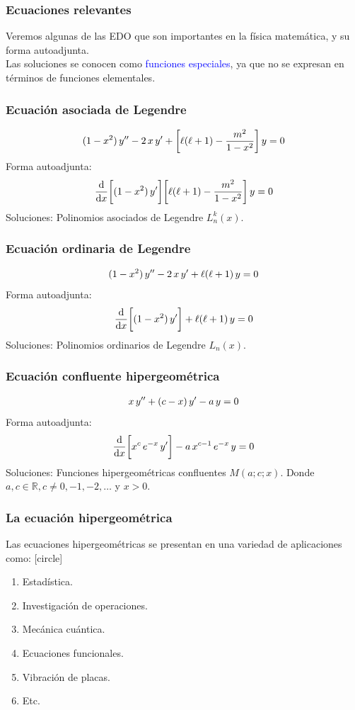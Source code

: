 \documentclass[12pt]{beamer}
\begin{document}
\begin{frame}
\frametitle{Ecuaciones relevantes}
Veremos algunas de las EDO que son importantes en la física matemática, y su forma autoadjunta.
\\
\bigskip
\pause
Las soluciones se conocen como \textcolor{blue}{funciones especiales}, ya que no se expresan en términos de funciones elementales.
\end{frame}
\begin{frame}
\frametitle{Ecuación asociada de Legendre}
\begin{align*}
(1 -x^{2}) \, {y}^{\prime \prime} - 2 \, x \, {y}^{\prime} + \bigg[ \ell (\ell + 1) - \dfrac{m^{2}}{1 - x^{2}} \bigg] \, y = 0
\end{align*}
\pause
Forma autoadjunta:
\begin{align*}
\dv{x} \bigg[ (1 - x^{2}) \, {y}^{\prime} \bigg] \bigg[ \ell (\ell + 1) - \dfrac{m^{2}}{1 - x^{2}} \bigg] \, y = 0
\end{align*}
\pause
Soluciones: Polinomios asociados de Legendre $L_{n}^{k} (x)$.
\end{frame}
\begin{frame}
\frametitle{Ecuación ordinaria de Legendre}
\begin{align*}
(1 -x^{2}) \, {y}^{\prime \prime} - 2 \, x \, {y}^{\prime} + \ell (\ell + 1) \, y = 0
\end{align*}
\pause
Forma autoadjunta:
\begin{align*}
\dv{x} \bigg[ (1 - x^{2}) \, {y}^{\prime} \bigg] + \ell (\ell + 1) \, y = 0
\end{align*}
\pause
Soluciones: Polinomios ordinarios de Legendre $L_{n}(x)$.
\end{frame}
\begin{frame}
\frametitle{Ecuación confluente hipergeométrica}
\begin{align*}
x \, {y}^{\prime \prime} + (c - x) \, {y}^{\prime} - a \, y = 0
\end{align*}
\pause
Forma autoadjunta:
\begin{align*}
\dv{x} \bigg[ x^{c} \, e^{-x} \, {y}^{\prime} \bigg] - a \, x^{c-1} \, e^{-x} \, y = 0
\end{align*}
\pause
Soluciones: Funciones hipergeométricas confluentes $M(a ;c ;x)$. Donde $a, c \in \mathbb{R}, c \neq 0, -1, -2, \ldots$ y $x > 0$.
\end{frame}
\begin{frame}
\frametitle{La ecuación hipergeométrica}
Las ecuaciones hipergeométricas se presentan en una variedad de aplicaciones como:
[circle]
\begin{enumerate}[<+->]
\item Estadística.
\item Investigación de operaciones.
\item Mecánica cuántica.
\item Ecuaciones funcionales.
\item Vibración de placas.
\item Etc.
\end{enumerate}
\end{frame}
\end{document}
